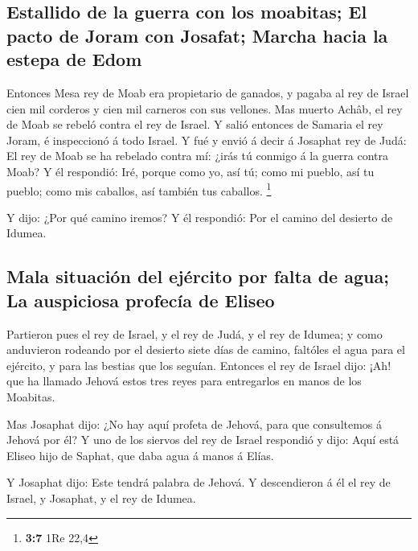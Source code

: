 \hypertarget{estallido-de-la-guerra-con-los-moabitas-el-pacto-de-joram-con-josafat-marcha-hacia-la-estepa-de-edom}{%
\subsection{Estallido de la guerra con los moabitas; El pacto de Joram
con Josafat; Marcha hacia la estepa de
Edom}\label{estallido-de-la-guerra-con-los-moabitas-el-pacto-de-joram-con-josafat-marcha-hacia-la-estepa-de-edom}}

 Entonces Mesa rey de Moab era propietario de ganados, y
pagaba al rey de Israel cien mil corderos y cien mil carneros con sus
vellones.  Mas muerto Achâb, el rey de Moab se rebeló contra
el rey de Israel.  Y salió entonces de Samaria el rey Joram,
é inspeccionó á todo Israel.  Y fué y envió á decir á
Josaphat rey de Judá: El rey de Moab se ha rebelado contra mí: ¿irás tú
conmigo á la guerra contra Moab? Y él respondió: Iré, porque como yo,
así tú; como mi pueblo, así tu pueblo; como mis caballos, así también
tus caballos. \footnote{\textbf{3:7} 1Re 22,4}

 Y dijo: ¿Por qué camino iremos? Y él respondió: Por el
camino del desierto de Idumea.

\hypertarget{mala-situaciuxf3n-del-ejuxe9rcito-por-falta-de-agua-la-auspiciosa-profecuxeda-de-eliseo}{%
\subsection{Mala situación del ejército por falta de agua; La auspiciosa
profecía de
Eliseo}\label{mala-situaciuxf3n-del-ejuxe9rcito-por-falta-de-agua-la-auspiciosa-profecuxeda-de-eliseo}}

 Partieron pues el rey de Israel, y el rey de Judá, y el rey
de Idumea; y como anduvieron rodeando por el desierto siete días de
camino, faltóles el agua para el ejército, y para las bestias que los
seguían.  Entonces el rey de Israel dijo: ¡Ah! que ha
llamado Jehová estos tres reyes para entregarlos en manos de los
Moabitas.

 Mas Josaphat dijo: ¿No hay aquí profeta de Jehová, para
que consultemos á Jehová por él? Y uno de los siervos del rey de Israel
respondió y dijo: Aquí está Eliseo hijo de Saphat, que daba agua á manos
á Elías.

 Y Josaphat dijo: Este tendrá palabra de Jehová. Y
descendieron á él el rey de Israel, y Josaphat, y el rey de Idumea.

